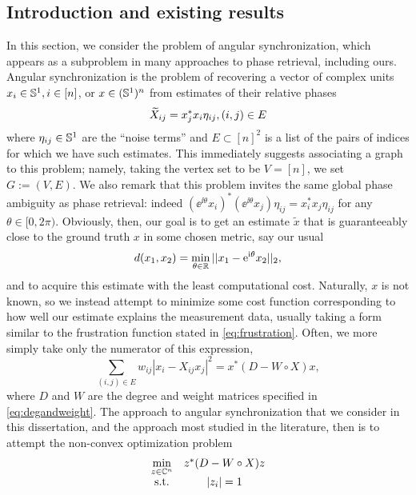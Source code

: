 \label{sec:ang_sync}
\subsection{Introduction and existing results}
In this section, we consider the problem of angular synchronization, which appears as a subproblem in many approaches to phase retrieval, including ours.  Angular synchronization is the problem of recovering a vector of complex units $x_i \in \mathbb{S}^1, i \in [n]$, or $x \in (\mathbb{S}^1)^n$ from estimates of their relative phases \[\widetilde{X}_{ij} = x_j^* x_i \eta_{ij}, (i, j) \in E\] where $\eta_{ij} \in \mathbb{S}^1$ are the ``noise terms'' and $E \subset [n]^2$ is a list of the pairs of indices for which we have such estimates.  This immediately suggests associating a graph to this problem; namely, taking the vertex set to be $V = [n]$, we set $G := (V, E)$.  We also remark that this problem invites the same global phase ambiguity as phase retrieval: indeed $(\ee^{\ii \theta} x_i)^* (\ee^{\ii \theta} x_j) \eta_{ij} = x_i^* x_j \eta_{ij}$ for any $\theta \in [0, 2\pi)$.  Obviously, then, our goal is to get an estimate $\tilde{x}$ that is guaranteeably close to the ground truth $x$ in some chosen metric, say our usual \[d(x_1, x_2) = \min_{\theta \in \mathbb{R}} || x_1 - \mathrm{e}^{\mathrm{i} \theta} x_2 ||_2,\] and to acquire this estimate with the least computational cost.  Naturally, $x$ is not known, so we instead attempt to minimize some cost function corresponding to how well our estimate explains the measurement data, usually taking a form similar to the frustration function stated in \eqref{eq:frustration}.  Often, we more simply take only the numerator of this expression, \[\sum_{(i, j) \in E} w_{ij} |x_i - X_{ij} x_j|^2 = x^* (D - W \circ X) x, \label{eq:ang_sync_cost}\] where $D$ and $W$ are the degree and weight matrices specified in \eqref{eq:degandweight}.  The approach to angular synchronization that we consider in this dissertation, and the approach most studied in the literature, then is to attempt the non-convex optimization problem \begin{equation} \begin{array}{cc} \min\limits_{z \in \mathbb{C}^n} & z^* (D - W \circ X) z \\ \text{s.t.} & |z_i| = 1 \end{array} \label{eq:ang_sync}\end{equation}

